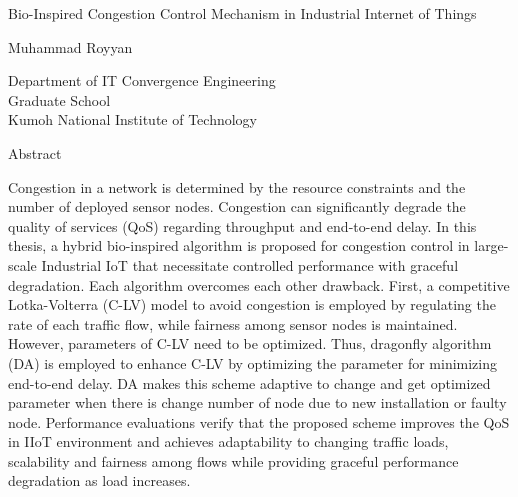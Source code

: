\begin{center}      
	\vspace*{0.5 cm}
	\begin{spacing}{1.6}
		{\fontsize{22}{30}\selectfont Bio-Inspired Congestion Control Mechanism in Industrial Internet of Things}
	\end{spacing}
	\vspace{1 cm}
	{\fontsize{14}{20}\selectfont Muhammad Royyan}
	
	\vspace{1 cm}
	\begin{spacing}{1.6}
		{\fontsize{14}{20}\selectfont Department of IT Convergence Engineering} \\ {\fontsize{14}{20}\selectfont Graduate School} \\ {\fontsize{14}{20}\selectfont Kumoh National Institute of Technology}
	\end{spacing}
	
	\vspace{1.5 cm}
	{\fontsize{14}{20}\selectfont Abstract}
	
	\vspace{1 cm}
\end{center}


Congestion in a network is determined by the resource constraints and the number of deployed sensor nodes. Congestion can significantly degrade the quality of services (QoS) regarding throughput and end-to-end delay. In this thesis, a hybrid bio-inspired algorithm is proposed for congestion control in large-scale Industrial IoT that necessitate controlled performance with graceful degradation. Each algorithm overcomes each other drawback. First, a competitive Lotka-Volterra (C-LV) model to avoid congestion is employed by regulating the rate of each traffic flow, while fairness among sensor nodes is maintained. However, parameters of C-LV need to be optimized. Thus, dragonfly algorithm (DA) is employed to enhance C-LV by optimizing the parameter for minimizing end-to-end delay. DA makes this scheme adaptive to change and get optimized parameter when there is change number of node due to new installation or faulty node. Performance evaluations verify that the proposed scheme improves the QoS in IIoT environment and achieves adaptability to changing traffic loads, scalability and fairness among flows while providing graceful performance degradation as load increases.
%

\newpage